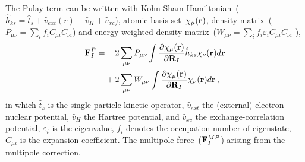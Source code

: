 \documentclass[journal=jpca,manuscript=article]{achemso}
\renewcommand{\vec}[1]{{\bf #1}}
\begin{document}
The Pulay term can be written with Kohn-Sham Hamiltonian~($\hat{h}_{ks}= \hat{t}_s + \hat{v}_{ext}(r)+\hat{v}_{H}+\hat{v}_{xc}$), atomic basis set~$\chi_\mu(\vec{r})$, density matrix~($P_{\mu\nu}=\sum_{i}f_{i} C_{\mu i} C_{\nu i}$) and energy weighted density matrix~($W_{\mu\nu}=\sum_{i}f_{i}\varepsilon_i C_{\mu i} C_{\nu i}$ ), 
\begin{eqnarray}
\vec{F}_I^{P} = & 
- 2\sum_{\mu\nu} P_{\mu\nu}\int{  \dfrac{\partial \chi_{\mu}(\mathbf{r}) }{\partial \mathbf{R}_I} \hat{h}_{ks} \chi_{\nu}(\mathbf{r}) d \mathbf{r}  } \nonumber \\
 & +2\sum_{\mu\nu} W_{\mu\nu}\int { \dfrac{\partial \chi_{\mu}(\mathbf{r}) }{\partial \mathbf{R}_I} \chi_{\nu}(\mathbf{r}) d \mathbf{r} } \,,\label{eq:F_pulay_use} 
\end{eqnarray}
in which $\hat{t}_s$ is the single particle kinetic operator, $\hat{v}_{ext}$ the (external) electron-nuclear potential, $\hat{v}_{H}$ the Hartree potential, and $\hat{v}_{xc}$ the exchange-correlation potential, $\varepsilon_i$ is the eigenvalue, $f_i$ denotes the occupation number of eigenstate, $C_{\mu i}$ is the expansion coefficient. The multipole force~($\vec{F}_I^{MP}$) arising from the multipole correction\cite{Blum2009}.
\end{document}
